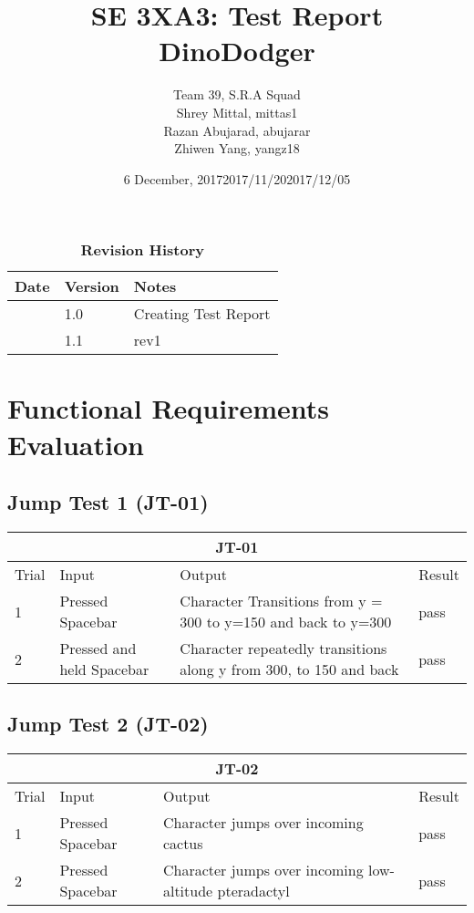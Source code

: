 \documentclass[12pt, titlepage]{article}
\title{SE 3XA3: Test Report\\DinoDodger}
\author{Team 39, S.R.A Squad
		\\ Shrey Mittal, mittas1
		\\ Razan Abujarad, abujarar
		\\ Zhiwen Yang, yangz18
}
\date{6 December, 2017}
\begin{document}
\maketitle

\tableofcontents
\listoftables
\listoffigures

\newpage
\begin{table}
\caption{\bf Revision History}
\begin{tabularx}{\textwidth}{p{3cm}p{2cm}X}
\toprule {\bf Date} & {\bf Version} & {\bf Notes}\\
\midrule
\date{2017/11/20} & 1.0 & Creating Test Report\\
\date{2017/12/05} & 1.1 & rev1\\
\bottomrule
\end{tabularx}
\end{table}

\newpage


\section{Functional Requirements Evaluation}
\subsection{Jump Test 1 (JT-01)}
\begin{tabular}{ |p{3cm}||p{3cm}|p{3cm}|p{3cm}|  }
 \hline
 \multicolumn{4}{|c|}{JT-01} \\
 \hline
Trial & Input & Output & Result\\
 \hline
1 & Pressed Spacebar & Character Transitions from  y = 300 to y=150 and back to y=300 &  pass\\
\midrule
2 & Pressed and held Spacebar & Character repeatedly transitions along y from 300, to 150 and back & pass\\
 \hline
\end{tabular}

\subsection{Jump Test 2 (JT-02)}
\begin{tabular}{ |p{3cm}||p{3cm}|p{3cm}|p{3cm}|  }
 \hline
 \multicolumn{4}{|c|}{JT-02} \\
 \hline
Trial & Input & Output & Result\\
 \hline
1 & Pressed Spacebar & Character jumps over incoming cactus &  pass\\
\midrule
2 & Pressed Spacebar & Character jumps over incoming low-altitude pteradactyl & pass\\
 \hline
\end{tabular}
\end{document}
